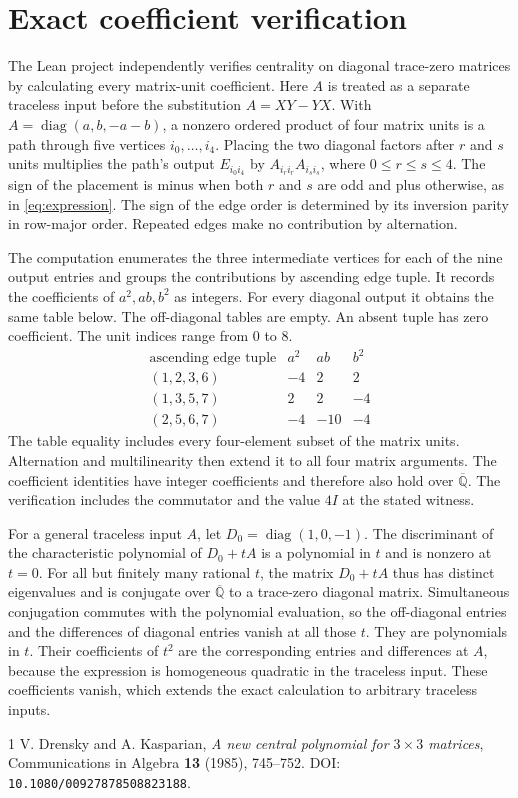 \documentclass[11pt]{article}
\begin{document}
\section*{Exact coefficient verification}
The Lean project independently verifies centrality on diagonal trace-zero
matrices by calculating every matrix-unit coefficient. Here \(A\) is
treated as a separate traceless input before the substitution
\(A=XY-YX\). With \(A=\operatorname{diag}(a,b,-a-b)\), a nonzero ordered
product of four matrix units is a path through five vertices
\(i_0,\ldots,i_4\). Placing the two diagonal factors after \(r\) and
\(s\) units multiplies the path's output \(E_{i_0 i_4}\) by
\(A_{i_r i_r}A_{i_s i_s}\), where \(0\le r\le s\le4\).
The sign of the placement is minus when both \(r\) and \(s\) are odd
and plus otherwise, as in \eqref{eq:expression}.
The sign of the edge order is determined by its inversion parity in
row-major order. Repeated edges make no contribution by alternation.

The computation enumerates the three intermediate vertices for each
of the nine output entries and groups the contributions by ascending
edge tuple. It records the coefficients of \(a^2,ab,b^2\) as
integers. For every diagonal output it obtains the same table below.
The off-diagonal tables are empty. An absent tuple has zero
coefficient. The unit indices range from \(0\) to \(8\).
\[
\begin{array}{c|rrr}
\text{ascending edge tuple} & a^2 & ab & b^2\\ \hline
(1,2,3,6) & -4 & 2 & 2\\
(1,3,5,7) & 2 & 2 & -4\\
(2,5,6,7) & -4 & -10 & -4
\end{array}
\]
The table equality includes every four-element subset of the matrix
units. Alternation and multilinearity then extend it to all four matrix
arguments. The coefficient identities have integer coefficients and
therefore also hold over \(\overline{\mathbb Q}\). The verification
includes the commutator and the value \(4I\) at the stated witness.

For a general traceless input \(A\), let \(D_0=\operatorname{diag}(1,0,-1)\).
The discriminant of the characteristic polynomial of \(D_0+tA\) is a
polynomial in \(t\) and is nonzero at \(t=0\). For all but finitely many
rational \(t\), the matrix \(D_0+tA\) thus has distinct eigenvalues and
is conjugate over \(\overline{\mathbb Q}\) to a trace-zero diagonal
matrix. Simultaneous conjugation commutes with the polynomial evaluation,
so the off-diagonal entries and the differences of diagonal entries
vanish at all those \(t\). They are polynomials in \(t\). Their coefficients
of \(t^2\) are the corresponding entries and differences at \(A\), because
the expression is homogeneous quadratic in the traceless input.
These coefficients vanish, which extends the exact calculation to
arbitrary traceless inputs.

\begin{thebibliography}{1}
V. Drensky and A. Kasparian, \emph{A new central polynomial for
\(3\times3\) matrices}, Communications in Algebra \textbf{13} (1985),
745--752. DOI: \texttt{10.1080/00927878508823188}.
\end{thebibliography}
\end{document}
